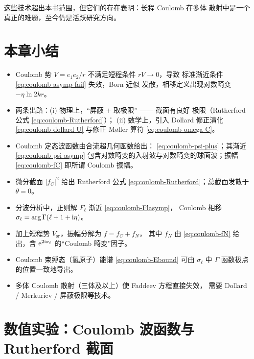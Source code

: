 这些技术超出本书范围，但它们的存在表明：长程 Coulomb 在多体
散射中是一个真正的难题，至今仍是活跃研究方向。

\section{本章小结}\label{sec:coulomb-summary}

\begin{itemize}
  \item Coulomb 势 $V=e_1 e_2/r$ 不满足短程条件 $rV\to 0$，导致
    标准渐近条件 \eqref{eq:coulomb-asymp-fail} 失效，Born 近似
    发散，相移定义出现对数畸变 $-\eta\ln 2kr$。

  \item 两条出路：(i) 物理上，``屏蔽 $+$ 取极限'' —— 截面有良好
    极限（Rutherford 公式 \eqref{eq:coulomb-Rutherford}）；
    (ii) 数学上，引入 Dollard 修正演化 \eqref{eq:coulomb-dollard-U}
    与修正 M{\o}ller 算符 \eqref{eq:coulomb-omega-C}。

  \item Coulomb 定态波函数由合流超几何函数给出：
    \eqref{eq:coulomb-psi-plus}；其渐近 \eqref{eq:coulomb-psi-asymp}
    包含对数畸变的入射波与对数畸变的球面波；振幅
    \eqref{eq:coulomb-fC} 即所谓 Coulomb 振幅。

  \item 微分截面 $|f_C|^2$ 给出 Rutherford 公式
    \eqref{eq:coulomb-Rutherford}；总截面发散于 $\theta=0$。

  \item 分波分析中，正则解 $F_\ell$ 渐近 \eqref{eq:coulomb-Flasymp}，
    Coulomb 相移 $\sigma_\ell=\arg\Gamma(\ell+1+\mathrm{i}\eta)$。

  \item 加上短程势 $V_{\mathrm{sr}}$，振幅分解为 $f=f_C+f_N$，
    其中 $f_N$ 由 \eqref{eq:coulomb-fN} 给出，含 $\mathrm{e}^{2\mathrm{i}\sigma_\ell}$
    的``Coulomb 畸变''因子。

  \item Coulomb 束缚态（氢原子）能谱 \eqref{eq:coulomb-Ebound}
    可由 $\sigma_\ell$ 中 $\Gamma$ 函数极点的位置一致地导出。

  \item 多体 Coulomb 散射（三体及以上）使 Faddeev 方程直接失效，
    需要 Dollard / Merkuriev / 屏蔽极限等技术。
\end{itemize}

\section{数值实验：Coulomb 波函数与 Rutherford 截面}\label{sec:numexp-ch12}

